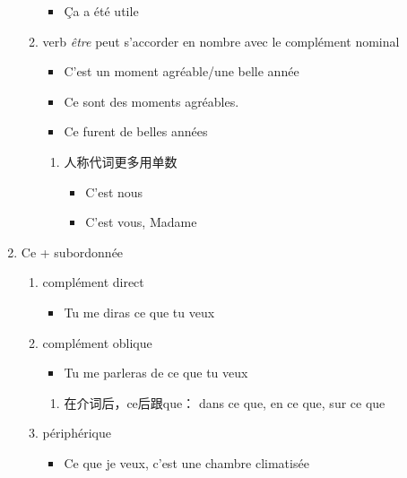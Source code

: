 \documentclass[UTF8]{report}
\begin{document}
\begin{enumerate}
\begin{enumerate}
\begin{itemize}
            \item Ça a été utile
        \end{itemize}
        \item verb \textit{être} peut s’accorder en nombre avec le complément nominal
        \begin{itemize}
            \item C’est un moment agréable/une belle année
            \item Ce sont des moments agréables.
            \item Ce furent de belles années
        \end{itemize}
        \begin{enumerate}
            \item 人称代词更多用单数
            \begin{itemize}
                \item C’est nous
                \item C’est vous, Madame
            \end{itemize}
        \end{enumerate}
    \end{enumerate}
    \item Ce + subordonnée
    \begin{enumerate}
        \item complément direct
        \begin{itemize}
            \item Tu me diras ce que tu veux
        \end{itemize}
        \item complément oblique
        \begin{itemize}
            \item Tu me parleras de ce que tu veux
        \end{itemize}
        \begin{enumerate}
            \item 在介词后，ce后跟que： dans ce que, en ce que, sur ce que
        \end{enumerate}
        \item périphérique
        \begin{itemize}
            \item Ce que je veux, c’est une chambre climatisée
        \end{itemize}
    \end{enumerate}
\end{enumerate}
\end{document}
